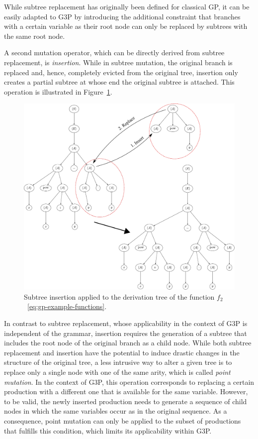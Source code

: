 While subtree replacement has originally been defined for classical GP, it can be easily adapted to G3P by introducing the additional constraint that branches with a certain variable as their root node can only be replaced by subtrees with the same root node.

A second mutation operator, which can be directly derived from subtree replacement, is \emph{insertion}.
While in subtree mutation, the original branch is replaced and, hence, completely evicted from the original tree, insertion only creates a partial subtree at whose end the original subtree is attached.
This operation is illustrated in Figure~\ref{fig:gp-insertion-mutation}.
\begin{figure}
	\centering
	\includegraphics[scale=0.46]{figures/trees/subtree_insertion_mutation.pdf}
	\caption{Subtree insertion applied to the derivation tree of the function $f_2$~\eqref{eq:gp-example-functions}.}
	\label{fig:gp-insertion-mutation}
\end{figure}
In contrast to subtree replacement, whose applicability in the context of G3P is independent of the grammar, insertion requires the generation of a subtree that includes the root node of the original branch as a child node.
While both subtree replacement and insertion have the potential to induce drastic changes in the structure of the original tree, a less intrusive way to alter a given tree is to replace only a single node with one of the same arity, which is called \emph{point mutation}.
In the context of G3P, this operation corresponds to replacing a certain production with a different one that is available for the same variable.
However, to be valid, the newly inserted production needs to generate a sequence of child nodes in which the same variables occur as in the original sequence.
As a consequence, point mutation can only be applied to the subset of productions that fulfills this condition, which limits its applicability within G3P.

